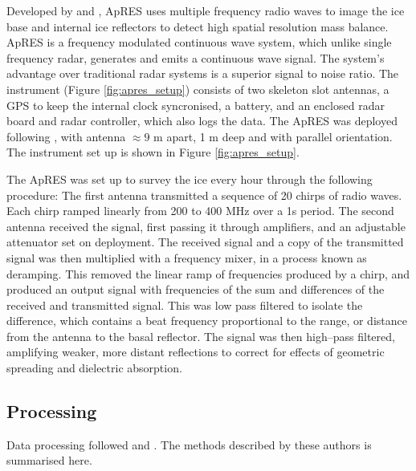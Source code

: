 Developed by \cite{brennan2014phase} and \cite{nicholls2015ground}, ApRES uses multiple frequency radio waves to image the ice base and internal ice reflectors to detect high spatial resolution mass balance.
ApRES is a frequency modulated continuous wave system, which unlike single frequency radar, generates and emits a continuous wave signal. The system's advantage over traditional radar systems is a superior signal to noise ratio. The instrument (Figure \ref{fig:apres_setup}) consists of two skeleton slot antennas, a GPS to keep the internal clock syncronised, a battery, and an enclosed radar board and radar controller, which also logs the data. The ApRES was deployed following \cite{nicholls2018apres}, with antenna $\approx 9$ m apart, 1 m deep and with parallel orientation. The instrument set up is shown in Figure \ref{fig:apres_setup}. 

The ApRES was set up to survey the ice every hour through the following procedure:
The first antenna transmitted a sequence of 20 chirps of radio waves. Each chirp ramped linearly from 200 to 400 MHz over a 1s period. The second antenna received the signal,  first passing it through amplifiers, and an adjustable attenuator set on deployment.  %
The received signal and a copy of the transmitted signal was then multiplied with a frequency mixer, in a process known as deramping. This removed the linear ramp of frequencies produced by a chirp, and produced an output signal with frequencies of the sum and differences of the received and transmitted signal. This was low pass filtered to isolate the difference,  which contains a beat frequency proportional to the range, or distance from the antenna to the basal reflector. 
The signal was then high--pass filtered, amplifying weaker, more distant reflections to correct for effects of geometric spreading and dielectric absorption.  




\subsection{Processing}

Data processing followed \cite{brennan2014phase} and \cite{nicholls2015ground}. The methods described by these authors is summarised here.

